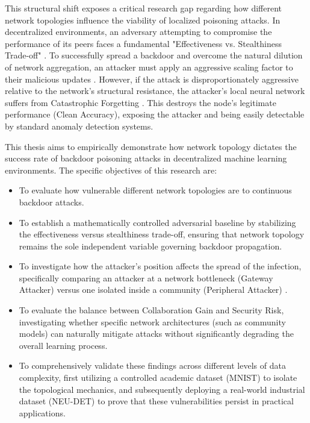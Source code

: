 This structural shift exposes a critical research gap regarding how different network topologies influence the viability of localized poisoning attacks. In decentralized environments, an adversary attempting to compromise the performance of its peers faces a fundamental "Effectiveness vs. Stealthiness Trade-off" \cite{yang2025stealthy, syros2024backdoor}. To successfully spread a backdoor and overcome the natural dilution of network aggregation, an attacker must apply an aggressive scaling factor to their malicious updates \cite{bagdasaryan2020how}. However, if the attack is disproportionately aggressive relative to the network's structural resistance, the attacker's local neural network suffers from Catastrophic Forgetting \cite{french1999catastrophic}. This destroys the node's legitimate performance (Clean Accuracy), exposing the attacker and being easily detectable by standard anomaly detection systems.

This thesis aims to empirically demonstrate how network topology dictates the success rate of backdoor poisoning attacks in decentralized machine learning environments. The specific objectives of this research are:

\begin{itemize}
    \item To evaluate how vulnerable different network topologies are to continuous backdoor attacks.
    \item To establish a mathematically controlled adversarial baseline by stabilizing the effectiveness versus stealthiness trade-off, ensuring that network topology remains the sole independent variable governing backdoor propagation.
    \item To investigate how the attacker's position affects the spread of the infection, specifically comparing an attacker at a network bottleneck (Gateway Attacker) versus one isolated inside a community (Peripheral Attacker) \cite{piaseczny2025adversarial}.
    \item To evaluate the balance between Collaboration Gain and Security Risk, investigating whether specific network architectures (such as community models) can naturally mitigate attacks without significantly degrading the overall learning process.
    \item To comprehensively validate these findings across different levels of data complexity, first utilizing a controlled academic dataset (MNIST) \cite{lecun1998gradient} to isolate the topological mechanics, and subsequently deploying a real-world industrial dataset (NEU-DET) \cite{bao2019neudet} to prove that these vulnerabilities persist in practical applications.
\end{itemize}

